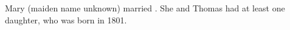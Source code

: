
Mary (maiden name unknown) married .
She and Thomas had at least one daughter,  who was born in 1801.

